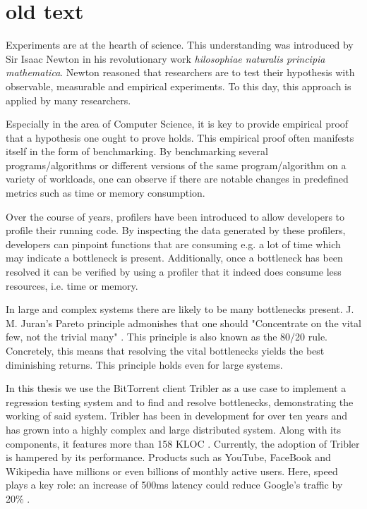 \section{old text}
Experiments are at the hearth of science.
This understanding was introduced by Sir Isaac Newton in his revolutionary work \emph{hilosophiae naturalis principia mathematica}.
Newton reasoned that researchers are to test their hypothesis with observable, measurable and empirical experiments.
To this day, this approach is applied by many researchers.

Especially in the area of Computer Science, it is key to provide empirical proof that a hypothesis one ought to prove holds.
This empirical proof often manifests itself in the form of benchmarking.
By benchmarking several programs/algorithms or different versions of the same program/algorithm on a variety of workloads, one can observe if there are notable changes in predefined metrics such as time or memory consumption.

Over the course of years, profilers have been introduced to allow developers to profile their running code.
By inspecting the data generated by these profilers, developers can pinpoint functions that are consuming e.g. a lot of time which may indicate a bottleneck is present.
Additionally, once a bottleneck has been resolved it can be verified by using a profiler that it indeed does consume less resources, i.e. time or memory.

In large and complex systems there are likely to be many bottlenecks present.
J. M. Juran's Pareto principle admonishes that one should "Concentrate on the vital few, not the trivial many" \cite{ammons2004finding}. This principle is also known as the 80/20 rule.
Concretely, this means that resolving the vital bottlenecks yields the best diminishing returns.
This principle holds even for large systems.

In this thesis we use the BitTorrent client Tribler as a use case to implement a regression testing system and to find and resolve bottlenecks, demonstrating the working of said system.
Tribler has been in development for over ten years and has grown into a highly complex and large distributed system.
Along with its components, it features more than 158 KLOC \cite{tribler2015about}.
Currently, the adoption of Tribler is hampered by its performance. 
Products such as YouTube, FaceBook and Wikipedia have millions or even billions of monthly active users.
Here, speed plays a key role: an increase of 500ms latency could reduce Google's traffic by 20\% \cite{mayer2009search}.

